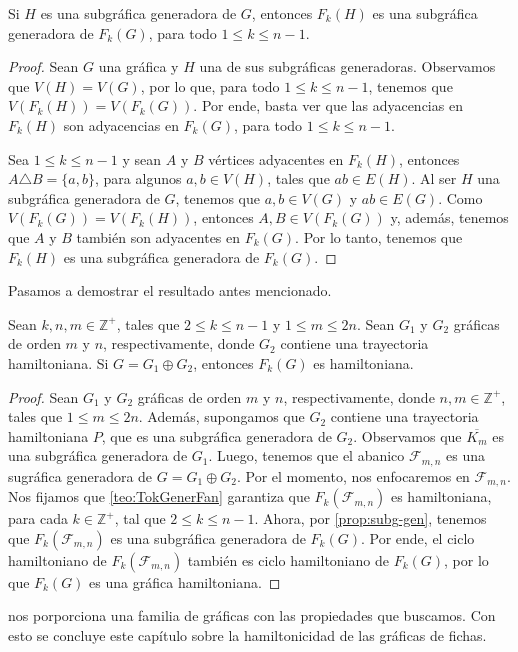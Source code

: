 \begin{proposicion}
\label{prop:subg-gen}
    Si $H$ es una subgr\'afica generadora de $G$, entonces $F_k(H)$ es una
    subgr\'afica generadora de $F_k(G)$, para todo $1 \leq k \leq n-1$.
\end{proposicion}

\begin{proof}
    Sean $G$ una gr\'afica y $H$ una de sus subgr\'aficas generadoras.
    Observamos que $V(H)=V(G)$, por lo que, para todo $1 \leq k \leq n-1$,
    tenemos que $V(F_k(H))=V(F_k(G))$. Por ende, basta ver que las adyacencias
    en $F_k(H)$ son adyacencias en $F_k(G)$, para todo $1 \leq k \leq n-1$.

    Sea $1 \leq k \leq n-1$ y sean $A$ y $B$ v\'ertices adyacentes en $F_k(H)$,
    entonces $ A \triangle B = \{a,b\}$, para algunos $a,b \in V(H)$, tales que
    $ab \in E(H)$. Al ser $H$ una subgr\'afica generadora de $G$, tenemos que
    $a,b \in V(G)$ y $ab \in E(G)$. Como $V(F_k(G))=V(F_k(H))$, entonces $A,B
    \in V(F_k(G))$ y, adem\'as, tenemos que $A$ y $B$ tambi\'en son adyacentes
    en $F_k(G)$. Por lo tanto, tenemos que $F_k(H)$ es una subgr\'afica
    generadora de $F_k(G)$.
\end{proof}

Pasamos a demostrar el resultado antes mencionado.

\begin{corolario}
\label{coro:Token-Join}
    Sean $k,n,m \in \mathbb{Z^{+}}$, tales que $2 \leq k \leq n-1$ y $1 \leq m
    \leq 2n$. Sean $G_1$ y $G_2$ gr\'aficas de orden $m$ y $n$, respectivamente,
    donde $G_2$ contiene una trayectoria hamiltoniana. Si $G = G_1 \oplus G_2$,
    entonces $F_k(G)$ es hamiltoniana. 
\end{corolario}

\begin{proof}
    Sean $G_1$ y $G_2$ gr\'aficas de orden $m$ y $n$, respectivamente, donde
    $n,m \in \mathbb{Z^{+}}$, tales que $1 \leq m \leq 2n$. Adem\'as, supongamos
    que $G_2$ contiene una trayectoria hamiltoniana $P$, que es una subgr\'afica
    generadora de $G_2$. Observamos que $\overline{K_m}$ es una subgr\'afica
    generadora de $G_1$. Luego, tenemos que el abanico $\mathcal{F}_{m,n}$ es
    una sugr\'afica generadora de $G= G_1 \oplus G_2$. Por el momento, nos
    enfocaremos en $\mathcal{F}_{m,n}$. Nos fijamos que \cref{teo:TokGenerFan}
    garantiza que $F_k(\mathcal{F}_{m,n})$ es hamiltoniana, para cada $k \in
    \mathbb{Z^{+}}$, tal que $2 \leq k \leq n-1$. Ahora, por
    \cref{prop:subg-gen}, tenemos que $F_k(\mathcal{F}_{m,n})$ es una
    subgr\'afica generadora de $F_k(G)$. Por ende, el ciclo hamiltoniano de
    $F_k(\mathcal{F}_{m,n})$ tambi\'en es ciclo hamiltoniano de $F_k(G)$, por lo
    que $F_k(G)$ es una gr\'afica hamiltoniana.
\end{proof}

 nos porporciona una familia de gr\'aficas con las
propiedades que buscamos. Con esto se concluye este cap\'itulo sobre la
hamiltonicidad de las gr\'aficas de fichas.
